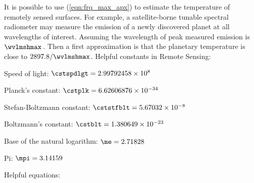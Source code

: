 \documentclass[12pt]{article}
\begin{document}
It is possible to use (\ref{eqn:frq_max_apx}) to estimate the
temperature of remotely sensed surfaces.
For example, a satellite-borne tunable spectral radiometer may measure
the emission of a newly discovered planet at all wavelengths of
interest.  
Assuming the wavelength of peak measured emission is $\wvlmshmax$\,\um.
Then a first approximation is that the planetary temperature is close
to $2897.8 / \wvlmshmax$.
\clearpage
\noindent%
Helpful constants in Remote Sensing:
\begin{enumerate*}
\item Speed of light: $\cstspdlgt = 2.99792458 \times 10^{8}$\,\mxs
\item Planck's constant: $\cstplk = 6.62606876 \times 10^{-34}$\,\js
\item Stefan-Boltzmann constant: $\cststfblt = 5.67032  \times 10^{-8}$\,\wxmSkQ
\item Boltzmann's constant: $\cstblt = 1.380649  \times 10^{-23}$\,\jxK
\item Base of the natural logarithm: $\me = 2.71828$
\item Pi: $\mpi = 3.14159$
\end{enumerate*}
Helpful equations:
\end{document}
